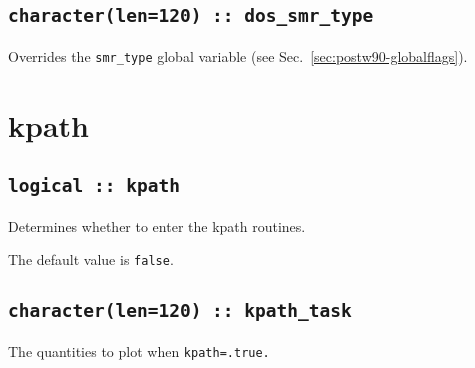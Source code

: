 \subsection[dos\_smr\_type]{\tt  character(len=120) :: dos\_smr\_type}
Overrides the \verb#smr_type# global variable (see Sec.~\ref{sec:postw90-globalflags}).


\clearpage
\section{kpath}

\subsection[berry]{\tt logical :: kpath}
Determines whether to enter the kpath routines.

The default value is \verb#false#.


\subsection[kpath\_task]{\tt character(len=120) ::  kpath\_task} 
The quantities to plot when {\tt kpath=.true.} 

